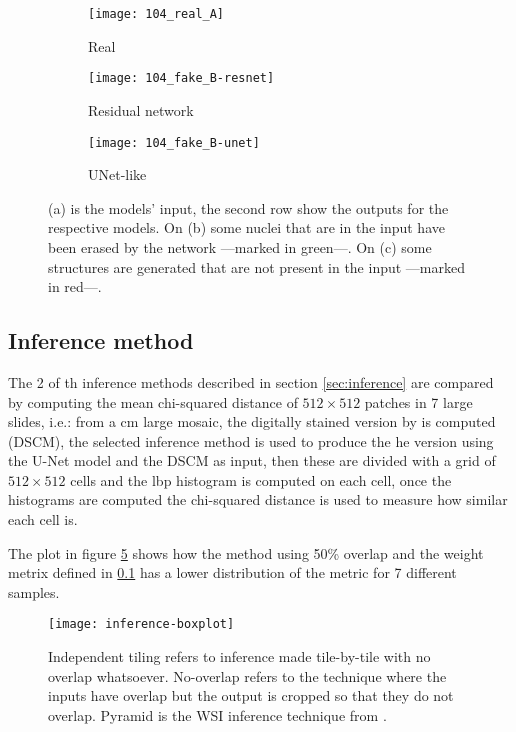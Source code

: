 \documentclass[../main.tex]{subfiles}
\begin{document}
\begin{figure}[h]
\centering
\begin{subfigure}{.5\textwidth}
  \centering
  \texttt{[image: 104\_real\_A]}
  \caption{Real}
  \label{fig:real-example}
\end{subfigure}
\begin{subfigure}{.5\textwidth}
  \centering
  \texttt{[image: 104\_fake\_B-resnet]}
  \caption{Residual network}
  \label{fig:resnet-example}
\end{subfigure}%
\begin{subfigure}{.5\textwidth}
  \centering
  \texttt{[image: 104\_fake\_B-unet]}
  \caption{UNet-like}
  \label{fig:unet-example}
\end{subfigure}
\caption{(a) is the models' input, the second row show the outputs for the
respective models. On (b) some nuclei that are in the input have been
erased by the network ---marked in green---. On (c) some structures are
generated that are not present in the input ---marked in red---.}
\label{fig:resnet-unet}
\end{figure}

\subsection{Inference method}
The 2 of th inference methods described in section \ref{sec:inference} are
compared by
computing the mean chi-squared distance of $512 \times 512$ patches 
in 7 large slides,
i.e.: from a \gls{cm} large mosaic, the digitally stained
version by \cite{Gareau2009} is computed (DSCM), the selected inference method
is used to produce the \gls{he} version using the U-Net model and the DSCM
as input, then these are divided with a grid of $512 \times 512$ cells and the
\gls{lbp} histogram is computed on each cell, once the histograms are computed
the chi-squared distance is used to measure how similar each cell is.

The plot in figure \ref{fig:inference-comparison} shows how the method using
50\% overlap and the weight metrix defined in \ref{} has a lower distribution
of the metric for 7 different samples.

\begin{figure}
\centering
\texttt{[image: inference-boxplot]}
\caption{Independent tiling refers to inference made tile-by-tile with no overlap
whatsoever. No-overlap refers to the technique where the inputs have overlap but
the output is cropped so that they do not overlap. Pyramid is the WSI inference
technique from \cite{Bel2019}.}
\label{fig:inference-comparison}
\end{figure}

\end{document}

